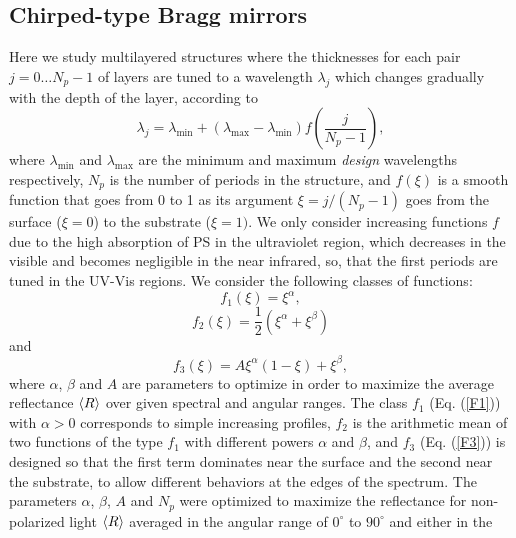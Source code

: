 \documentclass[a4paper,fleqn]{cas-sc}
\newcommand{\hl}[1]{{\color{blue}#1}}
\begin{document}
\subsection{Chirped-type Bragg mirrors}\label{ss:chirped}


Here we study multilayered structures where the thicknesses for each
pair $j=0\ldots N_p-1$ of layers are tuned to a wavelength $\lambda_j$ which changes
gradually with the depth of the layer, according to
\begin{equation}
        \lambda_{j}=\lambda_{\min }+\left(\lambda_{\max }-\lambda_{\min}\right) f\left(\frac{j}{N_p-1}\right),\label{Dis}
\end{equation}%
where $\lambda_{\min }$ and $\lambda_{\max }$ are the minimum and
maximum {\em design} wavelengths respectively, $N_p$ is the number of
periods  in the structure, and $f(\xi)$ is a smooth function that
goes from 0 to 1 as its argument \hl{$\xi=j/(N_p-1)$} goes from the surface ($\xi=0$) to the
substrate ($\xi=1)$. We only consider increasing functions $f$ due to
the high absorption of PS in the ultraviolet region, which decreases in
the visible and becomes negligible in the near infrared, so, that the first
periods are tuned in the UV-Vis regions. We consider the
following classes of functions:
\begin{equation}
        f_{1}\left(\xi \right) =\xi^{\alpha },  \label{F1}
\end{equation}
\begin{equation}
        f_{2}\left(\xi \right) =\frac{1}{2}\left(\xi^{\alpha }+\xi^{\beta}\right)
        \label{F2}
\end{equation}
and%
\begin{equation}
        f_{3}\left(\xi\right) =A\xi^{\alpha }\left(1-\xi\right) +\xi^{\beta },  \label{F3}
\end{equation}
where $\alpha$, $\beta$ and $A$ are parameters to optimize in order
to maximize the average reflectance $\braket{R}$ over given spectral
and angular ranges. The class
$f_{1}$ (Eq. (\ref {F1})) with  $\alpha>0$ corresponds to simple
increasing profiles, $f_2$ is the arithmetic mean
of two functions of the type $f_{1}$ with different
powers $\alpha$ and $\beta$, and $f_{3}$ (Eq. (\ref{F3})) is
designed so that the first term dominates near the surface and the
second near the substrate, to allow different behaviors
at the edges of the spectrum.
The parameters
$\alpha$, $\beta$, $A$ and $N_{p}$ were optimized to maximize the
reflectance for non-polarized light $\braket{R}$ averaged in the
angular range of $0^\circ$ to $90^\circ$ and either in the
\end{document}
